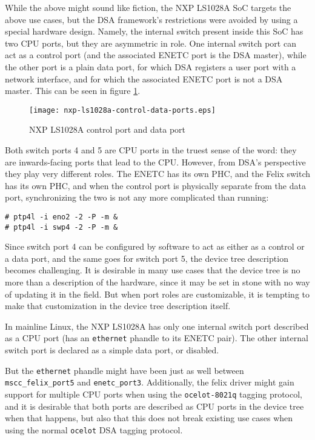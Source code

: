 \documentclass[letterpaper]{article}
\begin{document}
While the above might sound like fiction, the NXP LS1028A SoC targets the above
use cases, but the DSA framework's restrictions were avoided by using a special
hardware design. Namely, the internal switch present inside this SoC has two
CPU ports, but they are asymmetric in role. One internal switch port can act as
a control port (and the associated ENETC port is the DSA master), while the
other port is a plain data port, for which DSA registers a user port with a
network interface, and for which the associated ENETC port is not a DSA master.
This can be seen in figure \ref{nxp-ls1028a-control-data-ports}.

\begin{figure}[ht]
  \centering
  \texttt{[image: nxp-ls1028a-control-data-ports.eps]}
  \caption{NXP LS1028A control port and data port}
  \label{nxp-ls1028a-control-data-ports}
\end{figure}

Both switch ports 4 and 5 are CPU ports in the truest sense of the word: they
are inwards-facing ports that lead to the CPU. However, from DSA's perspective
they play very different roles. The ENETC has its own PHC, and the Felix switch
has its own PHC, and when the control port is physically separate from the data
port, synchronizing the two is not any more complicated than running:

\begin{verbatim}
# ptp4l -i eno2 -2 -P -m &
# ptp4l -i swp4 -2 -P -m &
\end{verbatim}

Since switch port 4 can be configured by software to act as either as a control
or a data port, and the same goes for switch port 5, the device tree
description becomes challenging. It is desirable in many use cases that the
device tree is no more than a description of the hardware, since it may be set
in stone with no way of updating it in the field. But when port roles are
customizable, it is tempting to make that customization in the device tree
description itself.

In mainline Linux, the NXP LS1028A has only one internal switch port described
as a CPU port (has an \verb|ethernet| phandle to its ENETC pair). The other
internal switch port is declared as a simple data port, or disabled.

But the \verb|ethernet| phandle might have been just as well between
\verb|mscc_felix_port5| and \verb|enetc_port3|. Additionally, the felix driver
might gain support for multiple CPU ports when using the \verb|ocelot-8021q|
tagging protocol, and it is desirable that both ports are described as CPU
ports in the device tree when that happens, but also that this does not break
existing use cases when using the normal \verb|ocelot| DSA tagging protocol.
\end{document}
